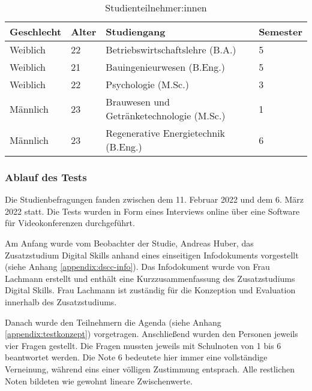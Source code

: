 \begin{table}[H]
\renewcommand*{\arraystretch}{1.6}
\centering
\begin{tabular}{|l|l|l|l|}
\hline
\textbf{Geschlecht} & \textbf{Alter} & \textbf{Studiengang}                      & \textbf{Semester} \\ \hline
Weiblich            & 22             & Betriebswirtschaftslehre (B.A.)           & 5                 \\ \hline
Weiblich            & 21             & Bauingenieurwesen (B.Eng.)                & 5                 \\ \hline
Weiblich            & 22             & Psychologie (M.Sc.)                       & 3                 \\ \hline
Männlich            & 23             & Brauwesen und Getränketechnologie (M.Sc.) & 1                 \\ \hline
Männlich            & 23             & Regenerative Energietechnik (B.Eng.)     & 6                 \\ \hline
\end{tabular}
\caption{Studienteilnehmer:innen}

\label{table:studie-teilnehmende}
\end{table}

\subsubsection{Ablauf des Tests}
Die Studienbefragungen fanden zwischen dem 11. Februar 2022 und dem 6. März 2022
statt. Die Tests wurden in Form eines Interviews online über eine Software für
Videokonferenzen durchgeführt.

Am Anfang wurde vom Beobachter der Studie, Andreas Huber, das Zusatzstudium
Digital Skills anhand eines einseitigen Infodokuments vorgestellt (siehe Anhang
\ref{appendix:dscc-info}). Das Infodokument wurde von Frau Lachmann erstellt und
enthält eine Kurzzusammenfassung des Zusatzstudiums Digital Skills. Frau
Lachmann ist zuständig für die Konzeption und Evaluation innerhalb des
Zusatzstudiums.

Danach wurde den Teilnehmern die Agenda (siehe Anhang
\ref{appendix:testkonzept}) vorgetragen. Anschließend wurden den Personen
jeweils vier Fragen gestellt. Die Fragen mussten jeweils mit Schulnoten
von 1 bis 6 beantwortet werden. Die Note 6 bedeutete hier immer eine
vollständige Verneinung, während eins einer völligen Zustimmung entsprach. Alle
restlichen Noten bildeten wie gewohnt lineare Zwischenwerte.

